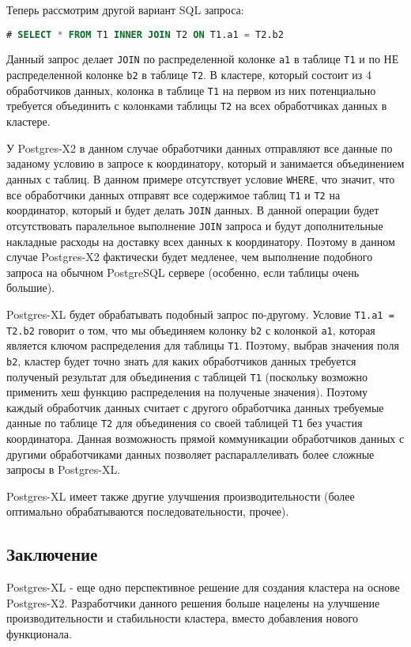 Теперь рассмотрим другой вариант SQL запроса:

\begin{lstlisting}[language=SQL,label=lst:postgres-xl1,caption=Запрос на распределенные таблицы]
# SELECT * FROM T1 INNER JOIN T2 ON T1.a1 = T2.b2
\end{lstlisting}

Данный запрос делает \lstinline!JOIN! по распределенной колонке \lstinline!a1! в таблице \lstinline!T1! и по НЕ распределенной колонке \lstinline!b2! в таблице \lstinline!T2!. В кластере, который состоит из 4 обработчиков данных, колонка в таблице \lstinline!T1! на первом из них потенциально требуется объединить с колонками таблицы \lstinline!T2! на всех обработчиках данных в кластере.

У Postgres-X2 в данном случае обработчики данных отправляют все данные по заданому условию в запросе к координатору, который и занимается объединением данных с таблиц. В данном примере отсутствует условие \lstinline!WHERE!, что значит, что все обработчики данных отправят все содержимое таблиц \lstinline!T1! и \lstinline!T2! на координатор, который и будет делать \lstinline!JOIN! данных. В данной операции будет отсутствовать паралельное выполнение \lstinline!JOIN! запроса и будут дополнительные накладные расходы на доставку всех данных к координатору. Поэтому в данном случае Postgres-X2 фактически будет медленее, чем выполнение подобного запроса на обычном PostgreSQL сервере (особенно, если таблицы очень большие).

Postgres-XL будет обрабатывать подобный запрос по-другому. Условие \lstinline!T1.a1 = T2.b2! говорит о том, что мы объединяем колонку \lstinline!b2! с колонкой \lstinline!a1!, которая является ключом распределения для таблицы \lstinline!T1!. Поэтому, выбрав значения поля \lstinline!b2!, кластер будет точно знать для каких обработчиков данных требуется полученый результат для объединения с таблицей \lstinline!T1! (поскольку возможно применить хеш функцию распределения на полученые значения). Поэтому каждый обработчик данных считает с другого обработчика данных требуемые данные по таблице \lstinline!T2! для объединения со своей таблицей \lstinline!T1! без участия координатора. Данная возможность прямой коммуникации обработчиков данных с другими обработчиками данных позволяет распараллеливать более сложные запросы в Postgres-XL.

Postgres-XL имеет также другие улучшения производительности (более оптимально обрабатываются последовательности, прочее).


\subsection{Заключение}

Postgres-XL - еще одно перспективное решение для создания кластера на основе Postgres-X2. Разработчики данного решения больше нацелены на улучшение производительности и стабильности кластера, вместо добавления нового функционала.

